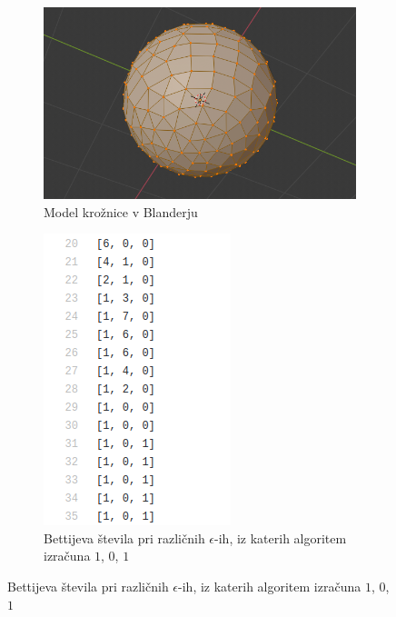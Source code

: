 \documentclass[a4paper,11pt]{article}
\begin{document}
    \begin{figure}[h!]
        \centering
        \begin{subfigure}[b]{0.4\linewidth}
          \includegraphics[width=\linewidth]{sphere.png}
          \caption{Model krožnice v Blanderju}
        \end{subfigure}
        \begin{subfigure}[b]{0.2\linewidth}
          \includegraphics[width=\linewidth]{sphere_betti.png}
          \caption{Bettijeva števila pri različnih $\epsilon$-ih, iz katerih algoritem izračuna $1$, $0$, $1$}
        \end{subfigure}
    
    \end{figure}
\end{document}
